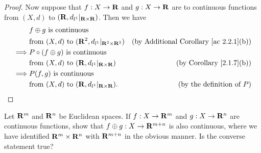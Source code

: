 \begin{proof}
    Now suppose that \(f : X \to \mathbf{R}\) and \(g : X \to \mathbf{R}\) are to continuous functions from \((X, d)\) to \((\mathbf{R}, d_{l^1}|_{\mathbf{R} \times \mathbf{R}})\).
    Then we have
    \begin{align*}
                 & f \oplus g \text{ is continuous }                                                                                        \\
                 & \text{from } (X, d) \text{ to } (\mathbf{R}^2, d_{l^1}|_{\mathbf{R}^2 \times \mathbf{R}^2}) & \text{(by Additional Corollary \ref{ac 2.2.1}(b))} \\
        \implies & P \circ (f \oplus g) \text{ is continuous }                                                                              \\
                 & \text{from } (X, d) \text{ to } (\mathbf{R}, d_{l^1}|_{\mathbf{R} \times \mathbf{R}})       & \text{(by Corollary \ref{2.1.7}(b))}               \\
        \implies & P(f, g) \text{ is continuous }                                                                                           \\
                 & \text{from } (X, d) \text{ to } (\mathbf{R}, d_{l^1}|_{\mathbf{R} \times \mathbf{R}}).      & \text{(by the definition of \(P\))}
    \end{align*}
\end{proof}

\begin{exercise}\label{ex 2.2.6}
    Let \(\mathbf{R}^m\) and \(\mathbf{R}^n\) be Euclidean spaces.
    If \(f : X \to \mathbf{R}^m\) and \(g : X \to \mathbf{R}^n\) are continuous functions, show that \(f \oplus g : X \to \mathbf{R}^{m + n}\) is also continuous, where we have identified \(\mathbf{R}^m \times \mathbf{R}^n\) with \(\mathbf{R}^{m + n}\) in the obvious manner.
    Is the converse statement true?
\end{exercise}

